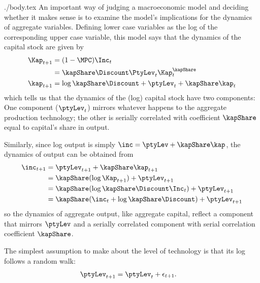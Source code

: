 \documentclass{handout}
\begin{document}
\begin{verbatimwrite}{./body.tex}
An important way of judging a macroeconomic
model and deciding whether it makes sense is to examine the model's
implications for the dynamics of aggregate variables.  Defining lower
case variables as the log of the corresponding upper case variable,
this model says that the dynamics of the capital stock are given by
\begin{equation}\begin{gathered}\begin{aligned}
   \Kap_{t+1} & =  (1-\MPC) \Inc_{t}
\\ & =  \kapShare\Discount \PtyLev_{t}\Kap_{t}^{\kapShare}
\\ \kap_{t+1} & =  \log \kapShare\Discount + \ptyLev_{t} + \kapShare \kap_{t} \label{eq:kDyn}
\end{aligned}\end{gathered}\end{equation}
which tells us that the dynamics of the (log) capital stock have two
components: One component ($\ptyLev_{t}$) mirrors whatever happens
to the aggregate production technology; the other 
is serially correlated with coefficient $\kapShare$ equal 
to capital's share in output.

Similarly, since log output is simply $\inc = \ptyLev + \kapShare \kap$, the dynamics
of output can be obtained from
\begin{equation}\begin{gathered}\begin{aligned}
  \inc_{t+1} & =  \ptyLev_{t+1} + \kapShare \kap_{t+1} 
\\ & =  \kapShare (\log \Kap_{t+1}) + \ptyLev_{t+1}
\\ & =  \kapShare (\log \kapShare \Discount \Inc_{t}) + \ptyLev_{t+1}
\\ & =  \kapShare (\inc_{t} + \log \kapShare \Discount ) + \ptyLev_{t+1}
\end{aligned}\end{gathered}\end{equation}
so the dynamics of aggregate output, like aggregate capital, 
reflect a component that mirrors $\ptyLev$ and a serially correlated 
component with serial correlation coefficient $\kapShare$.

The simplest assumption to make about the level of technology 
is that its log follows a random walk:
\begin{equation}\begin{gathered}\begin{aligned}
  \ptyLev_{t+1} & =  \ptyLev_{t} + \epsilon_{t+1}.
\end{aligned}\end{gathered}\end{equation}


\end{verbatimwrite}
\end{document}
